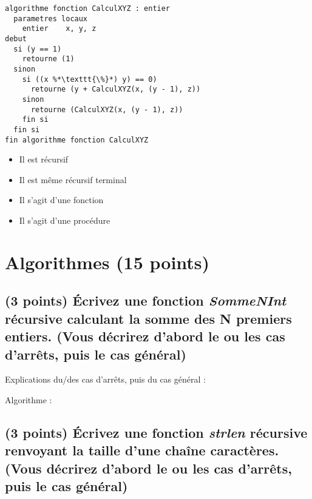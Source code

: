 \documentclass[11pt,a4paper]{article}
\begin{document}
\bigskip

\begin{lstlisting}[style=algorithmique]
algorithme fonction CalculXYZ : entier
  parametres locaux
    entier    x, y, z
debut
  si (y == 1)
    retourne (1)
  sinon
    si ((x %*\texttt{\%}*) y) == 0)
      retourne (y + CalculXYZ(x, (y - 1), z))
    sinon
      retourne (CalculXYZ(x, (y - 1), z))
    fin si
  fin si
fin algorithme fonction CalculXYZ \end{lstlisting}

\begin{itemize}
  \item[\checkmark] Il est récursif \\
  \item[\CaseCoche] Il est même récursif terminal \\
  \item[\checkmark] Il s'agit d'une fonction \\
  \item[\CaseCoche] Il s'agit d'une procédure \\
\end{itemize}


\clearpage

\section{Algorithmes (15 points)}

\subsection{(3 points) \'Ecrivez une fonction \og \textit{SommeNInt} \fg{} récursive calculant la somme des N premiers entiers. (Vous décrirez d'abord le ou les cas d'arrêts, puis le cas général) }

\bigskip

\begin{center}
Explications du/des cas d'arrêts, puis du cas général :

\bigskip

Algorithme :
\end{center}

\smallskip

\clearpage

\subsection{(3 points) \'Ecrivez une fonction \og \textit{strlen} \fg{} récursive renvoyant la taille d'une chaîne caractères.  (Vous décrirez d'abord le ou les cas d'arrêts, puis le cas général) }
\end{document}
